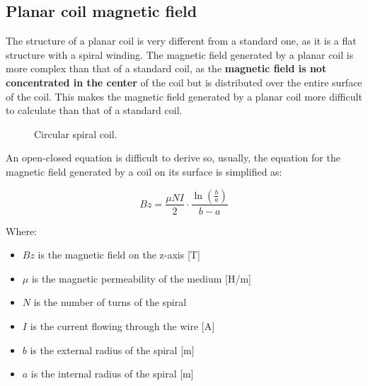 \subsection{Planar coil magnetic field}
The structure of a planar coil is very different from a standard one, as it is a flat structure with a spiral winding. The magnetic field generated by a planar coil is more complex than that of a standard coil, as the \textbf{magnetic field is not concentrated in the center} of the coil but is distributed over the entire surface of the coil. This makes the magnetic field generated by a planar coil more difficult to calculate than that of a standard coil.

\begin{figure}[H]
    \centering
    \resizebox{.3\linewidth}{!}{
    }
    \caption[Coil spiral]{Circular spiral coil.}
    \label{fig:Coil_spiral}
\end{figure}

\begin{samepage}
    An open-closed equation is difficult to derive so, usually, the equation for the magnetic field generated by a coil on its surface is simplified as:
    \nopagebreak

    \begin{equation}
        Bz = \frac{\mu N I}{2} \cdot \frac{\ln(\frac{b}{a})}{b-a} %
        \label{eq: Spiral_magn_field_eq}
    \end{equation}
    \nopagebreak

    Where:
    \begin{itemize}
        \item $Bz$ is the magnetic field on the z-axis [T]
        \item $\mu$ is the magnetic permeability of the medium [H/m]
        \item $N$ is the number of turns of the spiral
        \item $I$ is the current flowing through the wire [A]
        \item $b$ is the external radius of the spiral [m]
        \item $a$ is the internal radius of the spiral [m]
    \end{itemize}
\end{samepage}


